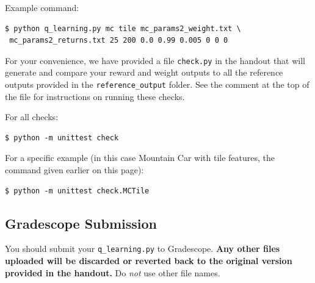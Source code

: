 \documentclass[11pt,addpoints,answers]{exam}
\begin{document}
Example command:
\begin{lstlisting}[language=Shell]
$ python q_learning.py mc tile mc_params2_weight.txt \
 mc_params2_returns.txt 25 200 0.0 0.99 0.005 0 0 0
\end{lstlisting}

For your convenience, we have provided a file \texttt{check.py} in the handout that will generate and compare your reward and weight outputs to all the reference outputs provided in the \texttt{reference\_output} folder. See the comment at the top of the file for instructions on running these checks.

For all checks:
\begin{lstlisting}[language=Shell]
$ python -m unittest check
\end{lstlisting}

For a specific example (in this case Mountain Car with tile features, the command given earlier on this page):
\begin{lstlisting}[language=Shell]
$ python -m unittest check.MCTile
\end{lstlisting}

\subsection{Gradescope Submission}

You should submit your \texttt{q\_learning.py} to Gradescope.
\textbf{Any other files uploaded will be discarded or reverted back to the original version provided in the handout.}
Do \textit{not} use other file names.    
\end{document}
